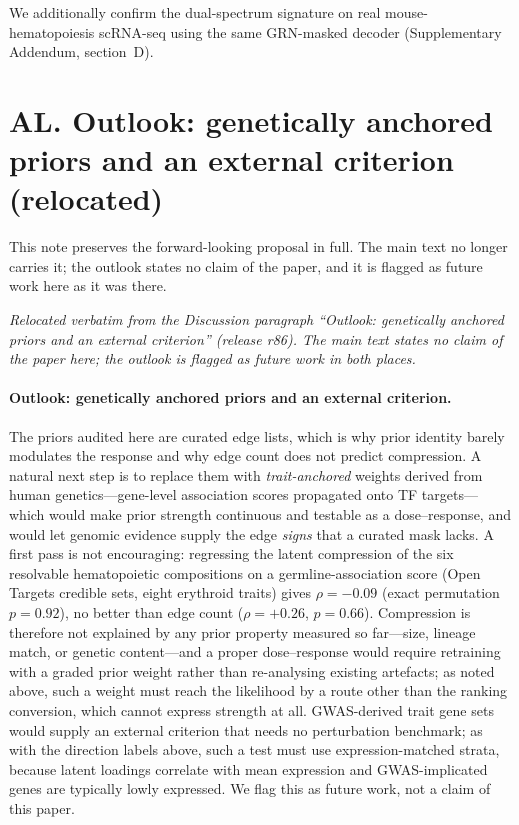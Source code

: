 \documentclass[11 pt,a4 paper]{article}
\begin{document}
We additionally confirm the dual-spectrum signature on real mouse-hematopoiesis scRNA-seq using the same GRN-masked decoder (Supplementary Addendum, section~D).

\clearpage

\section*{AL. Outlook: genetically anchored priors and an external criterion (relocated)}

This note preserves the forward-looking proposal in full. The main text no longer carries it; the
outlook states no claim of the paper, and it is flagged as future work here as it was there.

\noindent\emph{Relocated verbatim from the Discussion paragraph ``Outlook: genetically anchored priors and an external criterion'' (release r86). The main text states no claim of the paper here; the outlook is flagged as future work in both places.}

\paragraph*{Outlook: genetically anchored priors and an external criterion.}
The priors audited here are curated edge lists, which is why prior identity barely modulates the response and why edge count does not predict compression. A natural next step is to replace them with \emph{trait-anchored} weights derived from human genetics---gene-level association scores propagated onto TF targets---which would make prior strength continuous and testable as a dose--response, and would let genomic evidence supply the edge \emph{signs} that a curated mask lacks. A first pass is not encouraging: regressing the latent compression of the six resolvable hematopoietic compositions on a germline-association score (Open Targets credible sets, eight erythroid traits) gives $\rho=-0.09$ (exact permutation $p=0.92$), no better than edge count ($\rho=+0.26$, $p=0.66$). Compression is therefore not explained by any prior property measured so far---size, lineage match, or genetic content---and a proper dose--response would require retraining with a graded prior weight rather than re-analysing existing artefacts; as noted above, such a weight must reach the likelihood by a route other than the ranking conversion, which cannot express strength at all. GWAS-derived trait gene sets would supply an external criterion that needs no perturbation benchmark; as with the direction labels above, such a test must use expression-matched strata, because latent loadings correlate with mean expression and GWAS-implicated genes are typically lowly expressed. We flag this as future work, not a claim of this paper.
\end{document}
